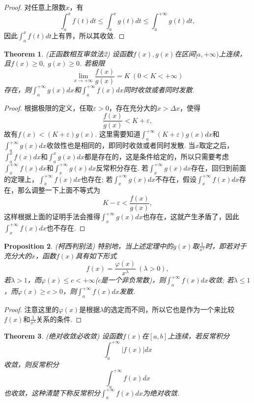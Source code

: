 \documentclass{article}
\newtheorem{theorem}{Theorem}[section]
\newtheorem{proposition}[theorem]{Proposition}
\begin{document}
\begin{proof}
对任意上限数$x$，有
$$
\int_a^x f(t)dt \leq \int_a^x g(t)dt \leq \int_a^{+\infty} g(t)dt,
$$
因此$\int_a^x f(t)dt$上有界，所以其收敛.
\end{proof}

\begin{theorem}
\rm \rm {\color{red} (正函数相互审敛法2)} 设函数$f(x),g(x)$在区间$[a,+\infty)$上连续，且$f(x)\geq 0,\; g(x) \geq 0$. 若极限
$$
\lim\limits_{x \rightarrow + \infty} \frac{f(x)}{g(x)} = K~(0 <  K <  +\infty)
$$
存在，则$\int_a^{+\infty} g(x)dx$和$\int_a^{+\infty} f(x)dx$同时收敛或者同时发散. 
\end{theorem}

\begin{proof}
根据极限的定义，任取$\varepsilon > 0$，存在充分大的$x > \Delta x$，使得
$$
\frac{f(x)}{g(x)} < K + \varepsilon,
$$
故有$f(x) <  (K+\varepsilon)g(x)$. 这里需要知道$\int_a^{+\infty}(K+\varepsilon)g(x)dx$和$\int_a^{+\infty}g(x)dx$收敛性也是相同的，即同时收敛或者同时发散. 当$x$取定之后，$\int_a^{x} f(x)dx$和$\int_a^{x} g(x)dx$都是存在的，这是条件给定的，所以只需要考虑$\int_{x}^{+\infty}f(x)dx$和$\int_{x}^{+\infty}g(x)dx$反常积分存在. 若$\int_{x}^{+\infty}g(x)dx$存在，回归到前面的定理上，$\int_{x}^{+\infty}f(x)dx$也存在; 若$\int_{x}^{+\infty}g(x)dx$不存在，假设$\int_{x}^{+\infty}f(x)dx$存在，那么调整一下上面不等式为
$$
K-\varepsilon < \frac{f(x)}{g(x)},
$$
这样根据上面的证明手法会推得$\int_{x}^{+\infty}g(x)dx$也存在，这就产生矛盾了，因此$\int_{x}^{+\infty}f(x)dx$也不存在. 
\end{proof}

\begin{proposition}
\rm {\color{red} (柯西判别法)} 特别地，当上述定理中的$g(x)$取$\frac{1}{x^\lambda}$时，即若对于充分大的$x$，函数$f(x)$具有如下形式
$$
f(x) = \frac{\varphi(x)}{x^\lambda}~(\lambda > 0),
$$
若$\lambda > 1$，而$\varphi(x) \leq c < + \infty$($c$是一个非负常数)，则$\int_a^{+\infty}f(x)dx$收敛; 若$\lambda \leq 1$，而$\varphi(x) \geq c >  0$，则$\int_a^{+\infty}f(x)dx$发散.
\end{proposition}

\begin{proof}
{\color{blue}注意这里的$\varphi(x)$是根据$\lambda$的选定而不同}，所以它也是作为一个来比较$f(x)$和$\frac{1}{x^\lambda}$关系的条件. 
\end{proof}

\begin{theorem}
\rm {\color{red} (绝对收敛必收敛)} 设函数$f(x)$在$[a,b]$上连续，若反常积分
$$
\int_a^{+\infty} |f(x)|dx
$$
收敛，则反常积分
$$
\int_a^{+\infty} f(x)dx
$$
也收敛，这种清楚下称反常积分$\int_a^{+\infty} f(x)dx$为{\color{red}绝对收敛}.
\end{theorem}
\end{document}
